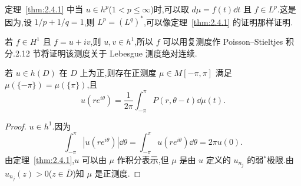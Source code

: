 定理~\ref{thm:2.4.1} 中当 $u \in h^{p}$($1 < p \leq \infty$)时,可以取 $d\mu = f(t)\dd t$ 且 $f \in L^{p}$.这是因为,设 $1/p + 1/q = 1$,则 $L^{p} = (L^{q})^{*}$,可以像定理~\ref{thm:2.4.1} 的证明那样证明.

若 $f \in H^{1}$ 且 $f = u + iv$,则 $u, v \in h^{1}$,所以 $f$ 可以用复测度作 Poisson--Stieltjes 积分.2.12 节将证明该测度关于 Lebesgue 测度绝对连续.

\begin{corollary}\label{cor:2.4.2}
若 $u \in h(D)$ 在 $D$ 上为正,则存在正测度 $\mu \in M[-\pi, \pi]$ 满足 $\mu(\{-\pi\}) = \mu(\{\pi\})$,且
\begin{equation*}
u(re^{i\theta}) = \frac{1}{2\pi}\int_{-\pi}^{\pi}P(r, \theta - t)\dd\mu(t).
\end{equation*}
\end{corollary}

\begin{proof}
$u \in h^{1}$.因为
\begin{equation*}
\int_{-\pi}^{\pi}|u(re^{i\theta})|\dd\theta = \int_{-\pi}^{\pi}u(re^{i\theta})\dd\theta = 2\pi u(0).
\end{equation*}
由定理~\ref{thm:2.4.1},$u$ 可以由 $\mu$ 作积分表示,但 $\mu$ 是由 $u$ 定义的 $u_{n_{j}}$ 的弱$^{*}$极限.由 $u_{n_{j}}(z) > 0$($z \in \overline{D}$)知 $\mu$ 是正测度.
\end{proof}
